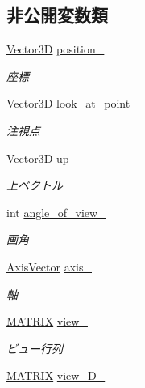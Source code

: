 \subsection*{非公開変数類}
\begin{DoxyCompactItemize}
\item 
\mbox{\hyperlink{class_vector3_d}{Vector3D}} \mbox{\hyperlink{class_camera_a0a3450c7cdfaa59456d92779ac9ea574}{position\+\_\+}}
\begin{DoxyCompactList}\small\item\em 座標 \end{DoxyCompactList}\item 
\mbox{\hyperlink{class_vector3_d}{Vector3D}} \mbox{\hyperlink{class_camera_a8253e46e7580737e7d22afae9aa5c0b6}{look\+\_\+at\+\_\+point\+\_\+}}
\begin{DoxyCompactList}\small\item\em 注視点 \end{DoxyCompactList}\item 
\mbox{\hyperlink{class_vector3_d}{Vector3D}} \mbox{\hyperlink{class_camera_a8df7d311c10a0c640ac480cb5cbada83}{up\+\_\+}}
\begin{DoxyCompactList}\small\item\em 上ベクトル \end{DoxyCompactList}\item 
int \mbox{\hyperlink{class_camera_a8c8ccaf83b140c65c458aa5d0077806c}{angle\+\_\+of\+\_\+view\+\_\+}}
\begin{DoxyCompactList}\small\item\em 画角 \end{DoxyCompactList}\item 
\mbox{\hyperlink{class_axis_vector}{Axis\+Vector}} \mbox{\hyperlink{class_camera_ad803bf87c68409f7f60836ae8fc25ab0}{axis\+\_\+}}
\begin{DoxyCompactList}\small\item\em 軸 \end{DoxyCompactList}\item 
\mbox{\hyperlink{_vector3_d_8h_a032295cd9fb1b711757c90667278e744}{M\+A\+T\+R\+IX}} \mbox{\hyperlink{class_camera_a5839ccb2cd4931e904a7a6cd412260ad}{view\+\_\+}}
\begin{DoxyCompactList}\small\item\em ビュー行列 \end{DoxyCompactList}\item 
\mbox{\hyperlink{_vector3_d_8h_a032295cd9fb1b711757c90667278e744}{M\+A\+T\+R\+IX}} \mbox{\hyperlink{class_camera_af6dbadc718d75c621fec94b76365ca57}{view\+\_\+D\+\_\+}}

\end{DoxyCompactItemize}
